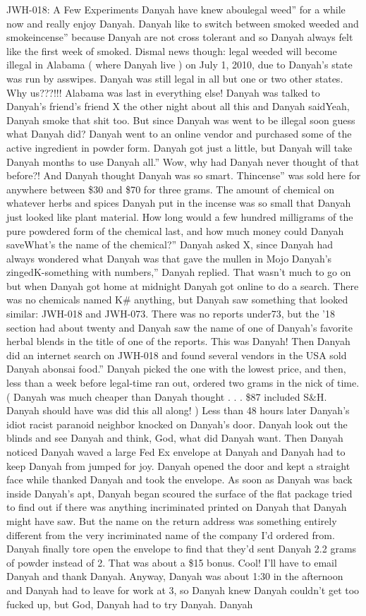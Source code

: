\documentclass[12pt]{book}
\begin{document}
JWH-018: A Few Experiments Danyah have knew aboulegal weed'' for a while now and really enjoy Danyah. Danyah like to switch between smoked weeded and smokeincense'' because Danyah are not cross tolerant and so Danyah always felt like the first week of smoked. Dismal news though: legal weeded will become illegal in Alabama ( where Danyah live ) on July 1, 2010, due to Danyah's state was run by asswipes. Danyah was still legal in all but one or two other states. Why us???!!! Alabama was last in everything else! Danyah was talked to Danyah's friend's friend X the other night about all this and Danyah saidYeah, Danyah smoke that shit too. But since Danyah was went to be illegal soon guess what Danyah did? Danyah went to an online vendor and purchased some of the active ingredient in powder form. Danyah got just a little, but Danyah will take Danyah months to use Danyah all.'' Wow, why had Danyah never thought of that before?! And Danyah thought Danyah was so smart. Thincense'' was sold here for anywhere between \$30 and \$70 for three grams. The amount of chemical on whatever herbs and spices Danyah put in the incense was so small that Danyah just looked like plant material. How long would a few hundred milligrams of the pure powdered form of the chemical last, and how much money could Danyah saveWhat's the name of the chemical?'' Danyah asked X, since Danyah had always wondered what Danyah was that gave the mullen in Mojo Danyah's zingedK-something with numbers,'' Danyah replied. That wasn't much to go on but when Danyah got home at midnight Danyah got online to do a search. There was no chemicals named K\# anything, but Danyah saw something that looked similar: JWH-018 and JWH-073. There was no reports under73, but the '18 section had about twenty and Danyah saw the name of one of Danyah's favorite herbal blends in the title of one of the reports. This was Danyah! Then Danyah did an internet search on JWH-018 and found several vendors in the USA sold Danyah abonsai food.'' Danyah picked the one with the lowest price, and then, less than a week before legal-time ran out, ordered two grams in the nick of time. ( Danyah was much cheaper than Danyah thought . . . \$87 included S\&H. Danyah should have was did this all along! ) Less than 48 hours later Danyah's idiot racist paranoid neighbor knocked on Danyah's door. Danyah look out the blinds and see Danyah and think, God, what did Danyah want. Then Danyah noticed Danyah waved a large Fed Ex envelope at Danyah and Danyah had to keep Danyah from jumped for joy. Danyah opened the door and kept a straight face while thanked Danyah and took the envelope. As soon as Danyah was back inside Danyah's apt, Danyah began scoured the surface of the flat package tried to find out if there was anything incriminated printed on Danyah that Danyah might have saw. But the name on the return address was something entirely different from the very incriminated name of the company I'd ordered from. Danyah finally tore open the envelope to find that they'd sent Danyah 2.2 grams of powder instead of 2. That was about a \$15 bonus. Cool! I'll have to email Danyah and thank Danyah. Anyway, Danyah was about 1:30 in the afternoon and Danyah had to leave for work at 3, so Danyah knew Danyah couldn't get too fucked up, but God, Danyah had to try Danyah. Danyah 
\end{document}

